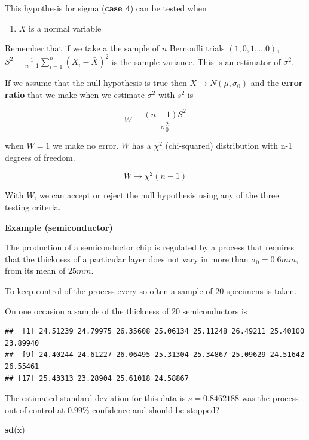 \documentclass[
]{book}
\newenvironment{Shaded}{\begin{snugshade}}{\end{snugshade}}
\newcommand{\FunctionTok}[1]{\textcolor[rgb]{0.13,0.29,0.53}{\textbf{#1}}}
\newcommand{\NormalTok}[1]{#1}
\providecommand{\tightlist}{%
  \setlength{\itemsep}{0pt}\setlength{\parskip}{0pt}}
\begin{document}
This hypothesis for sigma (\textbf{case 4}) can be tested when

\begin{enumerate}
\def\labelenumi{\arabic{enumi}.}
\tightlist
\item
  \(X\) is a normal variable
\end{enumerate}

Remember that if we take a the sample of \(n\) Bernoulli trials \((1,0,1,...0)\), \(S^2=\frac{1}{n-1}\sum_{i=1}^n (X_i-\bar{X})^2\) is the sample variance. This is an estimator of \(\sigma^2\).

If we assume that the null hypothesis is true then \(X \rightarrow N(\mu, \sigma_0)\) and the \textbf{error ratio} that we make when we estimate \(\sigma^2\) with \(s^2\) is

\[W=\frac{(n-1)S^2}{\sigma_0^2}\]

when \(W=1\) we make no error. \(W\) has a \(\chi^2\) (chi-squared) distribution with n-1 degrees of freedom.

\[W \rightarrow \chi^2(n-1)\]

With \(W\), we can accept or reject the null hypothesis using any of the three testing criteria.

\textbf{Example (semiconductor)}

The production of a semiconductor chip is regulated by a process that requires that the thickness of a particular layer does not vary in more than \(\sigma_0=0.6mm\), from its mean of \(25mm\).

To keep control of the process every so often a sample of \(20\) specimens is taken.

On one occasion a sample of the thickness of 20 semiconductors is

\begin{verbatim}
##  [1] 24.51239 24.79975 26.35608 25.06134 25.11248 26.49211 25.40100 23.89940
##  [9] 24.40244 24.61227 26.06495 25.31304 25.34867 25.09629 24.51642 26.55461
## [17] 25.43313 23.28904 25.61018 24.58867
\end{verbatim}

The estimated standard deviation for this data is \(s=0.8462188\) was the process out of control at \(0.99\%\) confidence and should be stopped?

\begin{Shaded}
\begin{Highlighting}[]
\FunctionTok{sd}\NormalTok{(x)}
\end{Highlighting}
\end{Shaded}
\end{document}
